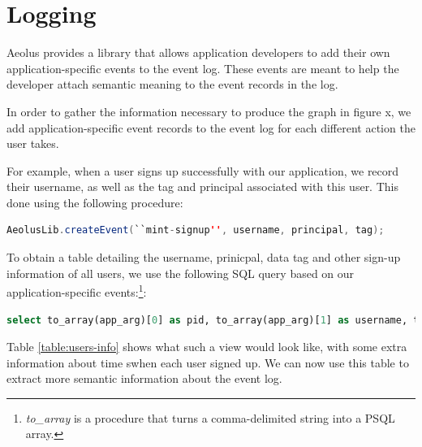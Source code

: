 \section{Logging}

Aeolus provides a library that allows application developers to add their own application-specific events to the event log. These events are meant to help the developer attach semantic meaning to the event records in the log.

In order to gather the information necessary to produce the graph in figure x, we add application-specific event records to the event log for each different action the user takes.

For example, when a user signs up successfully with our application, we record their username, as well as the tag and principal associated with this user. This done using the following procedure:

\begin{lstlisting}[language=Java]
  AeolusLib.createEvent(``mint-signup'', username, principal, tag);
\end{lstlisting}

To obtain a table detailing the username, prinicpal, data tag and other sign-up information of all users, we use the following SQL query based on our application-specific events:\footnote{\emph{to\_array} is a procedure that turns a comma-delimited string into a PSQL array.}:

\begin{lstlisting}[language=SQL, deletendkeywords={TIMESTAMP}]
select to_array(app_arg)[0] as pid, to_array(app_arg)[1] as username, to_array(app_arg)[2] as tag, timestamp as signed_up, event_counter from events where op_name='mint-signup'
\end{lstlisting}

Table \ref{table:users-info} shows what such a view would look like, with some extra information about time swhen each user signed up. We can now use this table to extract more semantic information about the event log.

